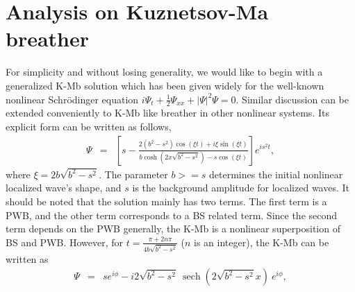 \documentclass[aps,twocolumn,showpacs]{revtex4}
\DeclareMathOperator{\sech}{sech}
\begin{document}
\section{Analysis on  Kuznetsov-Ma  breather}
For simplicity and without losing generality, we would like to begin with a generalized K-Mb solution which has been given widely for the well-known nonlinear Schr\"{o}dinger
equation  $i \Psi_{t}+\frac{1}{2}\Psi_{xx}+ |\Psi|^2 \Psi=0$. Similar discussion can be extended conveniently to K-Mb like breather in other nonlinear systems. Its explicit form can be  written as follows,
\begin{eqnarray}
\Psi&=&  \left[s-\frac{2(b^2-s^2)\cos(\xi t)+i \xi \sin(\xi t)}{b \cosh(2 x \sqrt{b^2-s^2})-s \cos(\xi t)}\right] e^{i s^2 t},
\end{eqnarray}
where $\xi=2 b \sqrt{b^2-s^2}$.
The parameter $b>=s$ determines the initial nonlinear localized wave's
shape, and $s$ is the background amplitude for
localized waves. It should be noted that the solution mainly has two terms.  The first term is a PWB, and the other term corresponds to a BS related term. Since the second term depends on the PWB generally, the K-Mb is a nonlinear superposition of BS and PWB. However, for $t=\frac{\pi+2 n \pi}{4 b \sqrt{b^2-s^2}}$ ($n$ is an integer), the K-Mb can be written as
 \begin{eqnarray}
\Psi&=& s e^{i \phi}-i 2\sqrt{b^2-s^2}\ \sech (2 \sqrt{b^2-s^2} x ) \ e^{i \phi },
\end{eqnarray}
\end{document}
